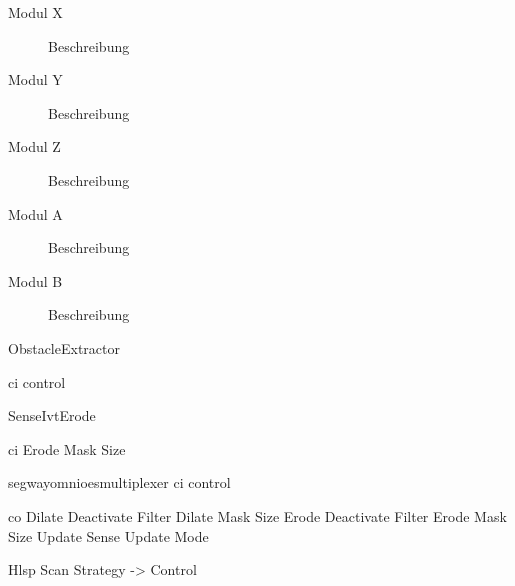 
\begin{description}
\item[Modul X] Beschreibung
\item[Modul Y] Beschreibung
\item[Modul Z] Beschreibung
\item[Modul A] Beschreibung
\item[Modul B] Beschreibung
\end{description}
ObstacleExtractor

ci control


SenseIvtErode

ci Erode Mask Size


segwayomnioesmultiplexer
ci control

co Dilate Deactivate Filter
Dilate Mask Size
Erode Deactivate Filter
Erode Mask Size
Update
Sense Update Mode

Hlsp Scan Strategy -> Control
